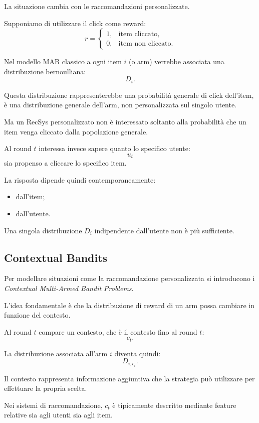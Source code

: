 La situazione cambia con le raccomandazioni personalizzate.

Supponiamo di utilizzare il click come reward:
\[
r=
\begin{cases}
1, & \text{item cliccato},\\
0, & \text{item non cliccato}.
\end{cases}
\]

Nel modello MAB classico a ogni item $i$ (o arm) verrebbe associata una distribuzione bernoulliana:
\[
D_i.
\]

Questa distribuzione rappresenterebbe una probabilità generale di click dell'item, è una distribuzione generale dell'arm, non personalizzata sul singolo utente.

Ma un RecSys personalizzato non è interessato soltanto alla probabilità che un item venga cliccato dalla popolazione generale.

Al round $t$ interessa invece sapere quanto lo specifico utente:
\[
u_t
\]
sia propenso a cliccare lo specifico item.

La risposta dipende quindi contemporaneamente:
\begin{itemize}
    \item dall'item;
    \item dall'utente.
\end{itemize}

Una singola distribuzione $D_i$ indipendente dall'utente non è più sufficiente.

\subsection{Contextual Bandits}

Per modellare situazioni come la raccomandazione personalizzata si introducono i \emph{Contextual Multi-Armed Bandit Problems}.

L'idea fondamentale è che la distribuzione di reward di un arm possa cambiare in funzione del contesto.

Al round $t$ compare un contesto, che è il contesto fino al round $t$:
\[
c_t.
\]

La distribuzione associata all'arm $i$ diventa quindi:
\[
D_{i,c_t}.
\]

Il contesto rappresenta informazione aggiuntiva che la strategia può utilizzare per effettuare la propria scelta.

Nei sistemi di raccomandazione, $c_t$ è tipicamente descritto mediante feature relative sia agli utenti sia agli item.

